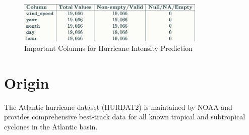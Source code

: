 \begin{figure}[h]
	\centering
	\includegraphics[width=0.8\textwidth]{Images/ImportantColumns.png}
	\caption{Important Columns for Hurricane Intensity Prediction}
	\label{fig:important-columns}
\end{figure}




\section{Origin}
The Atlantic hurricane dataset (HURDAT2) is maintained by NOAA and provides comprehensive best-track data for all known tropical and subtropical cyclones in the Atlantic basin\cite{noaa2021hurdat2}.
